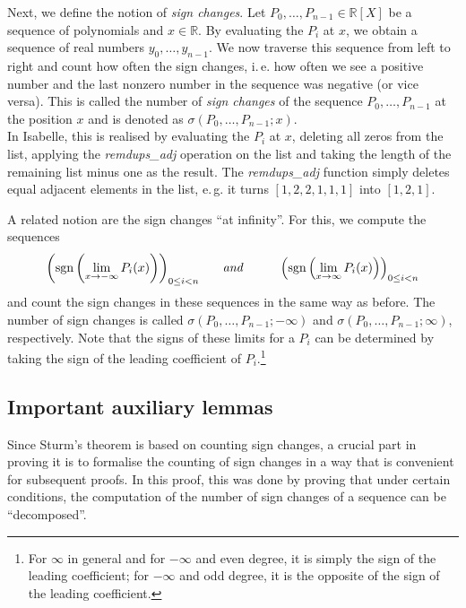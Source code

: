\documentclass[11pt,a4paper,oneside]{article}
\newcommand{\RR}{\mathbb{R}}
\newcommand{\sgn}{\mathrm{sgn}}
\newcommand{\ie}{i.\,e.\xspace}
\newcommand{\eg}{e.\,g.\xspace}
\begin{document}
Next, we define the notion of \emph{sign changes}. Let $P_0,\ldots,P_{n-1}\in\RR[X]$ be a sequence of polynomials and $x\in\RR$. By evaluating the $P_i$ at $x$, we obtain a sequence of real numbers $y_0,\ldots,y_{n-1}$. We now traverse this sequence from left to right and count how often the sign changes, \ie how often we see a positive number and the last nonzero number in the sequence was negative (or vice versa). This is called the number of \emph{sign changes} of the sequence $P_0,\ldots,P_{n-1}$ at the position $x$ and is denoted as $\sigma(P_0,\ldots,P_{n-1}; x)$.\\
In Isabelle, this is realised by evaluating the $P_i$ at $x$, deleting all zeros from the list, applying the \emph{remdups\_adj} operation on the list and taking the length of the remaining list minus one as the result. The \emph{remdups\_adj} function simply deletes equal adjacent elements in the list, \eg it turns $[1,2,2,1,1,1]$ into $[1,2,1]$.

A related notion are the sign changes \enquote{at infinity}. For this, we compute the sequences
$$\left(\sgn\left(\lim\limits_{x\to -\infty} P_i(x)\right)\right)_{0\leq i < n}\hskip6mm\textit{and}\hskip10mm
\left(\sgn\left(\lim\limits_{x\to \infty} P_i(x)\right)\right)_{0\leq i < n}$$
and count the sign changes in these sequences in the same way as before. The number of sign changes is called $\sigma(P_0,\ldots,P_{n-1};-\infty)$ and $\sigma(P_0,\ldots,P_{n-1};\infty)$, respectively. Note that the signs of these limits for a $P_i$ can be determined by taking the sign of the leading coefficient of $P_i$.\footnote{For $\infty$ in general and for $-\infty$ and even degree, it is simply the sign of the leading coefficient; for $-\infty$ and odd degree, it is the opposite of the sign of the leading coefficient.}

\subsection{Important auxiliary lemmas}
\label{sec:aux_lemmas}

Since Sturm's theorem is based on counting sign changes, a crucial part in proving it is to formalise the counting of sign changes in a way that is convenient for subsequent proofs. In this proof, this was done by proving that under certain conditions, the computation of the number of sign changes of a sequence can be \enquote{decomposed}.
\end{document}
